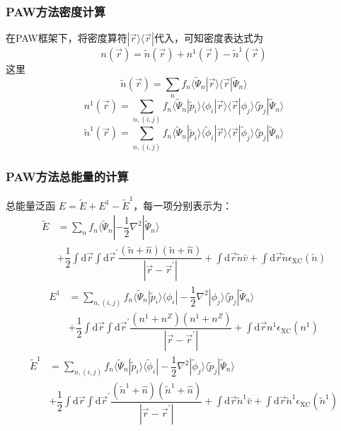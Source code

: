 \documentclass[cjk,slidestop,compress,mathserif,blue]{beamer}
\begin{document}
\frame
{
\frametitle{\textrm{PAW}方法密度计算}
在\textrm{PAW}框架下，将密度算符$|\vec r\rangle\langle\vec r|$代入，可知密度表达式为
$$n(\vec r)=\tilde n(\vec r)+n^1(\vec r)-\tilde n^1(\vec r)$$
这里
$$\tilde n(\vec r)=\sum_nf_n\langle\tilde\Psi_n|\vec r\rangle\langle\vec r|\tilde\Psi_n\rangle$$ 
$$n^1(\vec r)=\sum_{n,(i,j)}f_n\langle\tilde\Psi_n|\tilde p_i\rangle\langle\phi_i|\vec r\rangle\langle\vec r|\phi_j\rangle\langle\tilde p_j|\tilde\Psi_n\rangle$$
$$\tilde n^1(\vec r)=\sum_{n,(i,j)}f_n\langle\tilde\Psi_n|\tilde p_i\rangle\langle\tilde\phi_i|\vec r\rangle\langle\vec r|\tilde\phi_j\rangle\langle\tilde p_j|\tilde\Psi_n\rangle$$
}

\frame
{
\frametitle{\textrm{PAW}方法总能量的计算}
总能量泛函
$E=\tilde E+E^1-\tilde E^1$，每一项分别表示为：
\begin{displaymath}
	\begin{aligned}
		\tilde E&=\sum_nf_n\langle\tilde\Psi_n|-\dfrac12\nabla^2|\tilde\Psi_n\rangle\\
		 &+\dfrac12\int\mathrm{d}\vec r\int\mathrm{d}\vec r^{\prime}\dfrac{(\tilde n+\hat n)(\tilde n+\hat n)}{|\vec r-\vec r^{\prime}|}+\int\mathrm{d}\vec r \tilde n\bar v+\int\mathrm{d}\vec r \tilde n\epsilon_{\mathrm{XC}}(\tilde n)
 	\end{aligned}
\end{displaymath}
\begin{displaymath}
	\begin{aligned}
		E^1&=\sum_{n,(i,j)}f_n\langle\tilde\Psi_n|\tilde p_i\rangle\langle\phi_i|-\dfrac12\nabla^2|\phi_j\rangle\langle\tilde p_j|\tilde\Psi_n\rangle\\
		 &+\dfrac12\int\mathrm{d}\vec r\int\mathrm{d}\vec r^{\prime}\dfrac{(n^1+n^Z)(n^1+n^Z)}{|\vec r-\vec r^{\prime}|}+\int\mathrm{d}\vec r n^1\epsilon_{\mathrm{XC}}(n^1)
 	\end{aligned}
\end{displaymath}
\begin{displaymath}
	\begin{aligned}
		\tilde E^1&=\sum_{n,(i,j)}f_n\langle\tilde\Psi_n|\tilde p_i\rangle\langle\tilde\phi_i|-\dfrac12\nabla^2|\tilde\phi_j\rangle\langle\tilde p_j|\tilde\Psi_n\rangle\\
		 &+\dfrac12\int\mathrm{d}\vec r\int\mathrm{d}\vec r^{\prime}\dfrac{(\tilde n^1+\hat n)(\tilde n^1+\hat n)}{|\vec r-\vec r^{\prime}|}+\int\mathrm{d}\vec r \tilde n^1\bar v+\int\mathrm{d}\vec r \tilde n^1\epsilon_{\mathrm{XC}}(\tilde n^1)
 	\end{aligned}
\end{displaymath}
}
\end{document}
